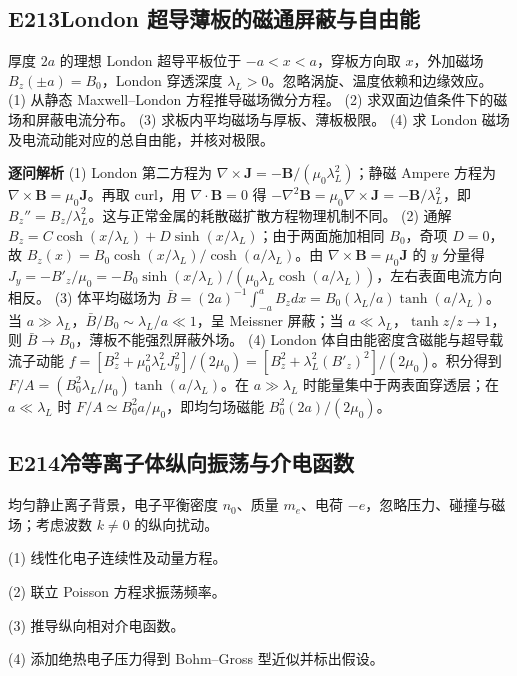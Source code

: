 \subsection*{E213\quad London 超导薄板的磁通屏蔽与自由能}
厚度 $2a$ 的理想 London 超导平板位于 $-a<x<a$，穿板方向取 $x$，外加磁场 $B_z(\pm a)=B_0$，London 穿透深度 $\lambda_L>0$。忽略涡旋、温度依赖和边缘效应。
(1) 从静态 Maxwell–London 方程推导磁场微分方程。
(2) 求双面边值条件下的磁场和屏蔽电流分布。
(3) 求板内平均磁场与厚板、薄板极限。
(4) 求 London 磁场及电流动能对应的总自由能，并核对极限。
\par\textbf{逐问解析}
(1) London 第二方程为 $\nabla\times\mathbf J=-\mathbf B/(\mu_0\lambda_L^2)$；静磁 Ampere 方程为 $\nabla\times\mathbf B=\mu_0\mathbf J$。再取 curl，用 $\nabla\cdot\mathbf B=0$ 得 $-\nabla^2\mathbf B=\mu_0\nabla\times\mathbf J=-\mathbf B/\lambda_L^2$，即 $B_z''=B_z/\lambda_L^2$。这与正常金属的耗散磁扩散方程物理机制不同。
(2) 通解 $B_z=C\cosh(x/\lambda_L)+D\sinh(x/\lambda_L)$；由于两面施加相同 $B_0$，奇项 $D=0$，故 $B_z(x)=B_0\cosh(x/\lambda_L)/\cosh(a/\lambda_L)$。由 $\nabla\times\mathbf B=\mu_0\mathbf J$ 的 $y$ 分量得 $J_y=-B'_z/\mu_0=-B_0\sinh(x/\lambda_L)/(\mu_0\lambda_L\cosh(a/\lambda_L))$，左右表面电流方向相反。
(3) 体平均磁场为 $\bar B=(2a)^{-1}\int_{-a}^aB_zdx=B_0(\lambda_L/a)\tanh(a/\lambda_L)$。当 $a\gg\lambda_L$，$\bar B/B_0\sim\lambda_L/a\ll1$，呈 Meissner 屏蔽；当 $a\ll\lambda_L$，$\tanh z/z\to1$，则 $\bar B\to B_0$，薄板不能强烈屏蔽外场。
(4) London 体自由能密度含磁能与超导载流子动能 $f=[B_z^2+\mu_0^2\lambda_L^2J_y^2]/(2\mu_0)=[B_z^2+\lambda_L^2(B'_z)^2]/(2\mu_0)$。积分得到 $F/A=(B_0^2\lambda_L/\mu_0)\tanh(a/\lambda_L)$。在 $a\gg\lambda_L$ 时能量集中于两表面穿透层；在 $a\ll\lambda_L$ 时 $F/A\simeq B_0^2a/\mu_0$，即均匀场磁能 $B_0^2(2a)/(2\mu_0)$。
\par\medskip

\subsection*{E214\quad 冷等离子体纵向振荡与介电函数}

均匀静止离子背景，电子平衡密度 $n_0$、质量 $m_e$、电荷 $-e$，忽略压力、碰撞与磁场；考虑波数 $k\ne0$ 的纵向扰动。

(1) 线性化电子连续性及动量方程。

(2) 联立 Poisson 方程求振荡频率。

(3) 推导纵向相对介电函数。

(4) 添加绝热电子压力得到 Bohm–Gross 型近似并标出假设。

